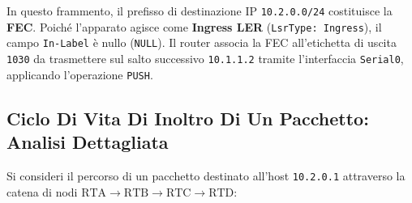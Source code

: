 \documentclass[11pt, a4paper]{article}
\begin{document}
In questo frammento, il prefisso di destinazione IP \texttt{10.2.0.0/24} costituisce la \textbf{FEC}. Poiché l'apparato agisce come \textbf{Ingress LER} (\texttt{LsrType: Ingress}), il campo \texttt{In-Label} è nullo (\texttt{NULL}). Il router associa la FEC all'etichetta di uscita \texttt{1030} da trasmettere sul salto successivo \texttt{10.1.1.2} tramite l'interfaccia \texttt{Serial0}, applicando l'operazione \texttt{PUSH}.

\subsection{Ciclo Di Vita Di Inoltro Di Un Pacchetto: Analisi Dettagliata}
Si consideri il percorso di un pacchetto destinato all'host \texttt{10.2.0.1} attraverso la catena di nodi $\text{RTA} \rightarrow \text{RTB} \rightarrow \text{RTC} \rightarrow \text{RTD}$:
\end{document}
